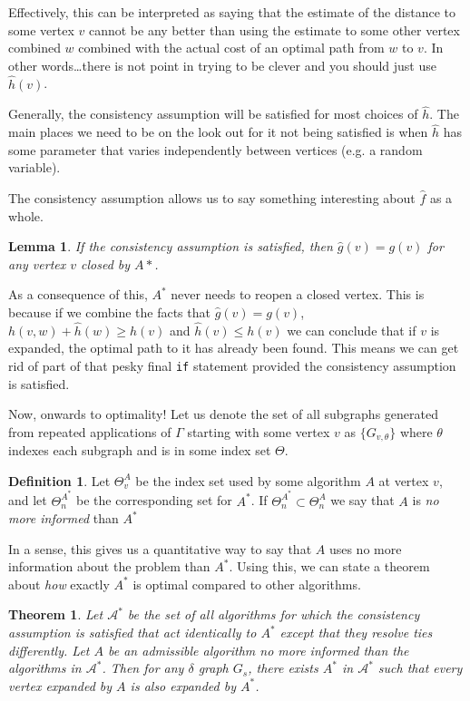\documentclass[letterpaper, 10pt]{article}
\newcommand{\keyw}[1]{\textit{\color{magenta}#1}}
\newtheorem{lemma}{Lemma}[section]
\newtheorem{thm}{Theorem}[section]
\theoremstyle{definition}
\newtheorem{defn}{Definition}[section]
\theoremstyle{Algorithm}
\begin{document}
\noindent Effectively, this can be interpreted as saying that
the estimate of the distance to some vertex $v$ cannot be any
better than using the estimate to some other vertex combined
$w$ combined with the actual cost of an  optimal path from 
$w$ to $v$. In other words\dots there is not point in trying
to be clever and you should just use $\hat{h}(v)$.

Generally, the consistency assumption will be satisfied for most
choices of $\hat{h}$. The main places we need to be on the
look out for it not being satisfied is when $\hat{h}$
has some parameter that varies independently between vertices
(e.g. a random variable).

The consistency assumption allows us to say something interesting
about $\hat{f}$ as a whole.

\begin{lemma}
  If the consistency assumption is satisfied, then
  $\hat{g}(v) = g(v)$ for any vertex $v$ closed by $A*$.
\end{lemma}

As a consequence of this, $A^*$ never needs to reopen a closed
vertex. This is because if we combine the facts 
that $\hat{g}(v) = g(v)$, $h(v,w) + \hat{h}(w) \geq \hat{h}(v)$
and $\hat{h}(v) \leq h(v)$
we can conclude that if $v$ is expanded, the optimal path 
to it has already been found.
This means we can get rid of part of that pesky
final \texttt{if} statement provided the consistency assumption
is satisfied. 

Now, onwards to optimality! Let us denote the set of all
subgraphs generated from repeated applications of $\Gamma$
starting with some vertex $v$ as $\{G_{v,\theta}\}$ where
$\theta$ indexes each subgraph and is in some index set $\Theta$.

\begin{defn}

  Let $\Theta_v^A$ be the index set used by some algorithm $A$
  at vertex $v$, and let $\Theta_n^{A^*}$ be the corresponding
  set for $A^*$. If $\Theta_n^{A^*}\subset\Theta_n^A$ we say
  that $A$ is \keyw{no more informed} than $A^*$

\end{defn}

In a sense, this gives us a quantitative way to say that
$A$ uses no more information about the problem than $A^*$.
Using this, we can state a theorem about \textit{how} exactly
$A^*$ is optimal compared to other algorithms.

\begin{thm}

  Let $\mathcal{A}^*$ be the set of all algorithms 
  for which the consistency assumption is satisfied that act
  identically to $A^*$ except that they resolve ties differently.
  Let $A$ be an admissible algorithm no more informed than
  the algorithms in $\mathcal{A}^*$. Then for any
  $\delta$ graph $G_s$, there exists $A^*$ in
  $\mathcal{A}^*$ such that every vertex expanded by $A$ is 
  also expanded by $A^*$.

\end{thm}
\end{document}
